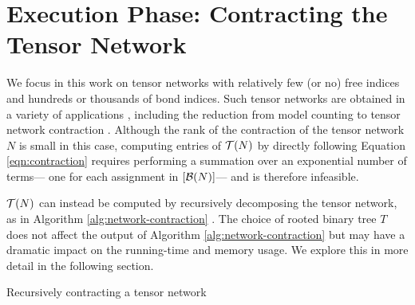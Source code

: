 \section{Execution Phase: Contracting the Tensor Network}
\label{sec:tensors:execution}
We focus in this work on tensor networks with relatively few (or no) free indices and hundreds or thousands of bond indices. Such tensor networks are obtained in a variety of applications \cite{Cichocki14,DLVR18}, including the reduction from model counting to tensor network contraction \cite{BMT15}. Although the rank of the contraction of the tensor network $N$ is small in this case, computing entries of $\mathcal{T}(N)$ by
directly following Equation \ref{eqn:contraction} requires performing a summation over an exponential number of terms--- one for each assignment in $[\mathcal{B}(N)]$--- and is therefore infeasible.

$\mathcal{T}(N)$ can instead be computed by recursively decomposing the tensor network, as in Algorithm \ref{alg:network-contraction} \cite{EP14}. The choice of rooted binary tree $T$ does not affect the output of Algorithm \ref{alg:network-contraction} but may have a dramatic impact on the running-time and memory usage. We explore this in more detail in the following section.

\begin{algorithm*}[t]
    \label{alg:network-contraction}
    \caption{Recursively contracting a tensor network}
    
    \DontPrintSemicolon
\end{algorithm*}
